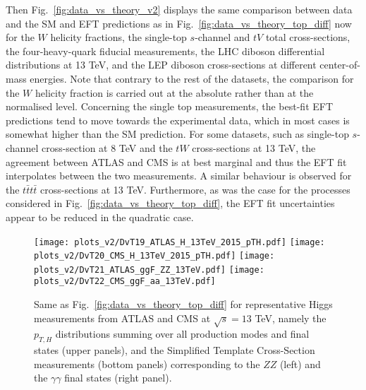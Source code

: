 Then Fig.~\ref{fig:data_vs_theory_v2} displays the same comparison between data and the SM and EFT
predictions as in Fig.~\ref{fig:data_vs_theory_top_diff} now for the $W$ helicity fractions,
the single-top $s$-channel and $tV$ total cross-sections, the four-heavy-quark fiducial
measurements, the LHC diboson differential distributions at 13 TeV, and the LEP diboson cross-sections
at different center-of-mass energies.
%
Note that contrary to the rest of the datasets, the comparison for the $W$ helicity fraction is carried
out at the absolute rather than at the normalised level.
%
Concerning the single top measurements, the best-fit EFT predictions tend
to move towards the experimental data, which in most cases is somewhat
higher than the SM prediction.
%
For some datasets, such as single-top $s$-channel cross-section at 8 TeV and the $tW$ cross-sections
at 13 TeV, the agreement between ATLAS and CMS is at best marginal and thus
the EFT fit interpolates between the two measurements.
%
A similar behaviour is observed for the $t\bar{t}t\bar{t}$ cross-sections at 13 TeV.
%
Furthermore, as was the case for the processes
considered in Fig.~\ref{fig:data_vs_theory_top_diff}, the EFT fit uncertainties
appear to be reduced in the quadratic case.

\begin{figure}[t]
  \begin{center}
    \texttt{[image: plots\_v2/DvT19\_ATLAS\_H\_13TeV\_2015\_pTH.pdf]}
    \texttt{[image: plots\_v2/DvT20\_CMS\_H\_13TeV\_2015\_pTH.pdf]}
  \texttt{[image: plots\_v2/DvT21\_ATLAS\_ggF\_ZZ\_13TeV.pdf]}
  \texttt{[image: plots\_v2/DvT22\_CMS\_ggF\_aa\_13TeV.pdf]}
  \vspace{-0.4cm}
  \caption{\small Same as Fig.~\ref{fig:data_vs_theory_top_diff} for
   representative Higgs  measurements from ATLAS and CMS at $\sqrt{s}=13$ TeV,
    namely the $p_{T,H}$ distributions summing over all production modes and final states (upper panels),
    and the Simplified Template Cross-Section measurements (bottom panels)
    corresponding
    to the $ZZ$ (left) and the $\gamma\gamma$ final states (right panel).
 \label{fig:data_vs_theory_v4} }
 \end{center}
\end{figure}

